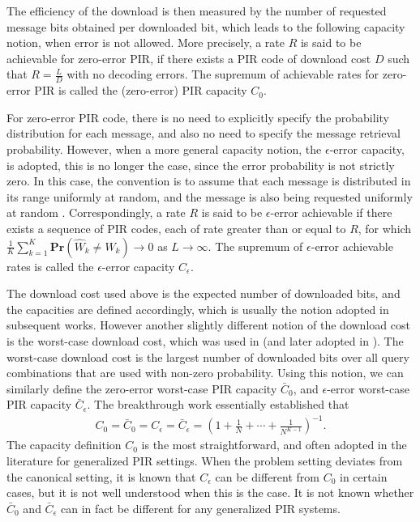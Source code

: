 The efficiency of the download is then measured by the number of requested message bits obtained per downloaded bit, which leads to the following capacity notion, when error is not allowed. More precisely, a rate $R$ is said to be achievable for zero-error PIR, if there exists a PIR code of download cost $D$ such that $R=\frac{L}{D}$ with no decoding errors. The supremum of achievable rates for zero-error PIR is called the (zero-error) PIR capacity $C_0$. 

For zero-error PIR code, there is no need to explicitly specify the probability distribution for each message, and also no need to specify the message retrieval probability. However, when a more general capacity notion, the $\epsilon$-error capacity, is adopted, this is no longer the case,  since the error probability is not strictly zero. In this case, the convention is to assume that each message is distributed in its range uniformly at random, and the message is also being requested uniformly at random \cite{sun2017PIRcapacity}. Correspondingly, a rate $R$ is said to be $\epsilon$-error achievable if there exists a sequence of PIR codes, each of rate greater than or equal to $R$, for which $\frac{1}{K}\sum_{k=1}^K\mathbf{Pr}(\hat{W}_k\neq W_k)\rightarrow 0$ as $L\rightarrow \infty$. The supremum of $\epsilon$-error achievable rates is called the $\epsilon$-error capacity $C_\epsilon$. 

The download cost used above is the expected number of downloaded bits, and the capacities are defined accordingly, which is usually the notion adopted in subsequent works. However another slightly different notion of the download cost is the worst-case download cost, which was used in \cite{sun2017optimal} (and later adopted in \cite{zhang2018optimal,jingke2017subScienceChina}). The worst-case download cost is the largest number of downloaded bits over all query combinations that are used with non-zero probability. Using this notion, we can similarly define the zero-error worst-case PIR capacity $\bar{C}_0$, and $\epsilon$-error worst-case PIR capacity $\bar{C}_\epsilon$. The breakthrough work \cite{sun2017PIRcapacity} essentially established that
\begin{align}
C_0=\bar{C}_0=C_\epsilon=\bar{C}_\epsilon=\left(1+\frac{1}{N}+\cdots+\frac{1}{N^{K-1}}\right)^{-1}.
\end{align}
The capacity definition $C_0$ is the most straightforward, and often adopted in the literature for generalized PIR settings. When the problem setting deviates from the canonical setting, it is known that $C_\epsilon$ can be different from $C_0$ in certain cases, but it is not well understood when this is the case. It is not known whether $\bar{C}_0$ and $\bar{C}_\epsilon$ can in fact be different for any generalized PIR systems.

